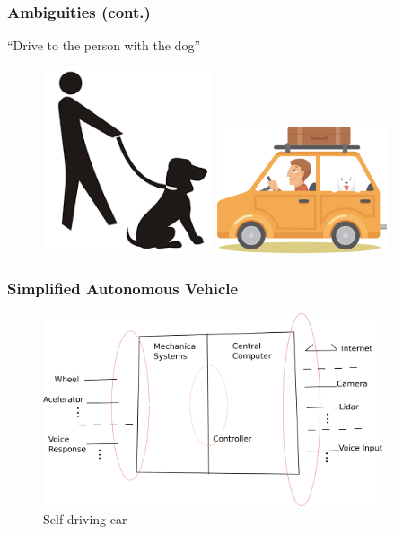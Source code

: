 \documentclass{beamer}
\begin{document}
\begin{frame}

\frametitle{Ambiguities (cont.)}

\begin{center}
\begin{minipage}{6cm}
\begin{alertblock}{}
``Drive to the person with the dog''
\end{alertblock}
\end{minipage}
\end{center}

\pause
\begin{figure}
\hspace*{-3mm}%
\centering
   \includegraphics[width=5cm]{pics/personDog.png}
   \pause
   \includegraphics[width=5cm]{pics/dogCar.png}
\end{figure}
  
\end{frame}

\begin{frame}
\frametitle{Simplified Autonomous Vehicle}
\begin{figure}
\centering
\includegraphics[width=100mm]{pics/selfDriving.png}
\caption{Self-driving car}\label{fig:A1}
\end{figure}

\end{frame}
\end{document}
